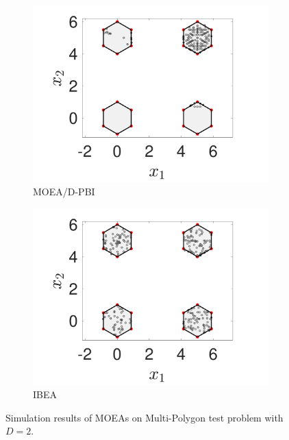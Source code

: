 \documentclass[conference]{IEEEtran}
\begin{document}
\begin{figure}[htbp]
    \begin{subfigure}[b]{.24\textwidth}
    \includegraphics[width=\linewidth]{Section5/dim2/PS/MOEAD_PBI}
    \caption{MOEA/D-PBI}
    \end{subfigure}
    \begin{subfigure}[b]{.24\textwidth}
    \includegraphics[width=\linewidth]{Section5/dim2/PS/IBEA}
    \caption{IBEA}
    \end{subfigure}

    \caption{Simulation results of MOEAs on Multi-Polygon test problem with $D=2$.}
    \label{fig: MOEAs PS dim=2}
\end{figure}
\end{document}
